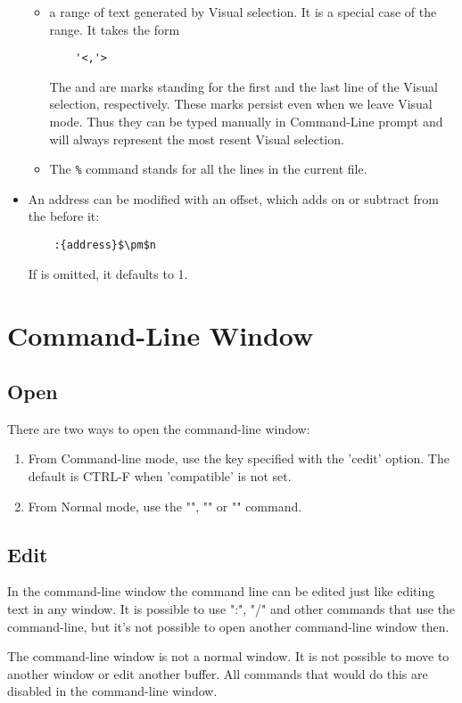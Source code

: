 \begin{itemize}
\begin{itemize}
      \item a range of text generated by Visual selection. It is a special case of the range. It takes the form 
	\begin{lstlisting}
	'<,'>
	\end{lstlisting}
	The  and  are marks standing for the first and the last line of the Visual selection, respectively.
	These marks persist even when we leave Visual mode. Thus they can be typed manually in Command-Line prompt and will always represent the most resent Visual selection.
      \item The \verb|%| command stands for all the lines in the current file.
    \end{itemize}
  \item An address can be modified with an offset, which adds on or subtract from the  before it:
    \begin{lstlisting}
    :{address}$\pm$n
    \end{lstlisting}
    If  is omitted, it defaults to 1.
\end{itemize}

\section{Command-Line Window}
\subsection{Open}
There are two ways to open the command-line window:
\begin{enumerate}
  \item From Command-line mode, use the key specified with the 'cedit' option.
    The default is CTRL-F when 'compatible' is not set.
  \item From Normal mode, use the "", "" or "" command.
\end{enumerate}

\subsection{Edit}
In the command-line window the command line can be edited just like editing
text in any window.
It is possible to use ":", "/" and other commands that use the command-line,
but it's not possible to open another command-line window then.

The command-line window is not a normal window.  It is not possible to move to
another window or edit another buffer.  All commands that would do this are
disabled in the command-line window.


